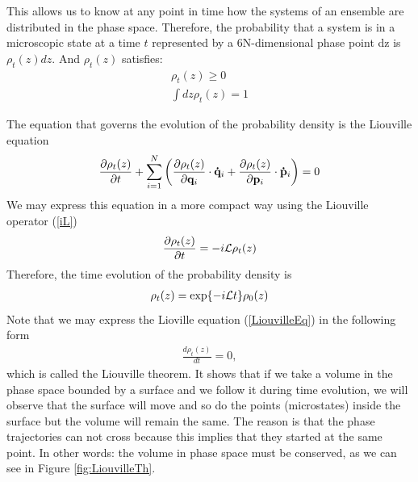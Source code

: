 \documentclass[a4paper,openright,12pt]{book}
\begin{document}
This allows us to know at any point in time how the systems of an ensemble are distributed in the phase space.
Therefore, the probability that a system is in a microscopic state at a time $t$ represented by a 6N-dimensional phase point dz is $\rho_t(z)dz$. And $\rho_t(z)$ satisfies:
\begin{align}
    \rho_t(z) \geq 0  \nonumber \\
    \int dz\rho_t(z) = 1
\end{align}

The equation that governs the evolution of the probability density is the Liouville equation
\begin{equation}
    \frac{\partial\rho_t(z)}{\partial t} + \sum_{i=1}^N\left(\frac{\partial\rho_t(z)}{\partial{\bf q}_i}\cdot{\bf \dot{q}}_i+\frac{\partial\rho_t(z)}{\partial{\bf p}_i}\cdot{\bf \dot{p}}_i\right) = 0
\end{equation}
We may express this equation in a more compact way using the Liouville operator (\ref{iL}) 
\begin{align}
    \frac{\partial\rho_t(z)}{\partial t} = -i{\cal L}\rho_t(z)
  \label{LiouvilleEq}
\end{align}
Therefore, the time evolution of the probability density is
\begin{align}
    \rho_t(z) = {\rm exp}\{-i{\cal L}t\}\rho_0(z)
    \label{rhot}
\end{align}
Note that we may express the Lioville equation (\ref{LiouvilleEq}) in the following form
\begin{align}
    \frac{d\rho_t(z)}{dt} = 0 ,
    \label{LiouvilleTh}
\end{align}
which is called the Liouville theorem. It shows that if we take a volume in the phase space bounded by a surface and we follow it during time evolution, we will observe that the surface will move and so do the points (microstates) inside the surface but the volume will remain the same. The reason is that the phase trajectories can not cross because this implies that they started at the same point. In other words: the volume in phase space must be conserved, as we can see in Figure \ref{fig:LiouvilleTh}.
\end{document}
